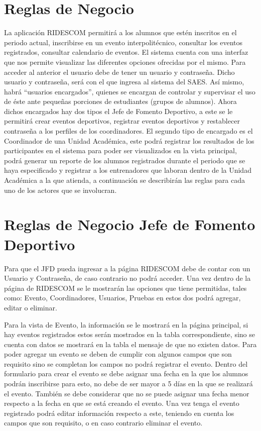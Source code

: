 \section{Reglas de Negocio}
\noindent La aplicación RIDESCOM permitirá a los alumnos que estén inscritos en el periodo actual, inscribirse en un evento interpolitécnico, consultar los eventos registrados, consultar calendario de eventos. 
El sistema cuenta con una interfaz que nos permite visualizar las diferentes opciones ofrecidas por el mismo. Para acceder al anterior el usuario debe de tener un usuario y contraseña. Dicho usuario y contraseña, será con el que ingresa al sistema del SAES. 
Así mismo, habrá “usuarios encargados”, quienes se encargan de controlar y supervisar el uso de éste ante pequeñas porciones de estudiantes (grupos de alumnos). Ahora dichos encargados hay dos tipos el Jefe de Fomento Deportivo, a este se le permitirá crear eventos deportivos, registrar eventos deportivos y restablecer contraseña a los perfiles de los coordinadores. El segundo tipo de encargado es el Coordinador de una Unidad Académica, este podrá registrar los resultados de los participantes en el sistema para poder ser visualizados en la vista principal, podrá generar un reporte de los alumnos registrados durante el periodo que se haya especificado y registrar a los entrenadores que laboran dentro de la Unidad Académica a la que atienda, a continuación se describirán las reglas para cada uno de los actores que se involucran.
\pagebreak


\section{Reglas de Negocio Jefe de Fomento Deportivo}
Para que el JFD pueda ingresar a la página RIDESCOM debe de contar con un Usuario y Contraseña, de caso contrario no podrá acceder.
Una vez dentro de la página de RIDESCOM se le mostrarán las opciones que tiene permitidas, tales como: Evento, Coordinadores, Usuarios, Pruebas en estos dos podrá agregar, editar o eliminar.

\noindent Para la vista de Evento, la información se le mostrará en la página principal, si hay eventos registrados estos serán mostrados en la tabla correspondiente, sino se cuenta con datos se mostrará en la tabla el mensaje de que no existen datos.  Para poder agregar un evento se deben de cumplir con algunos campos que son requisito sino se completan los campos no podrá registrar el evento.  Dentro del formulario para crear el evento se debe asignar una fecha en la que los alumnos podrán inscribirse para esto, no debe de ser mayor  a 5 días en la que se realizará el evento. También se debe considerar que no se puede asignar una fecha menor respecto a la fecha en que se está creando el evento. Una vez tenga el evento registrado podrá editar información respecto a este, teniendo en cuenta los campos que son requisito, o en caso contrario eliminar el evento.

